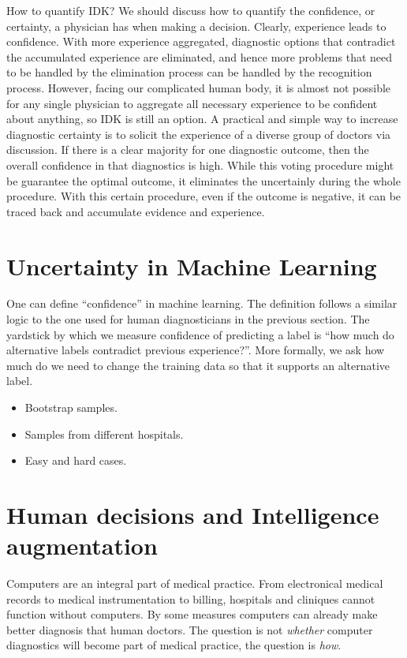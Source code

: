 \documentclass[12pt]{article}
\begin{document}
  How to quantify IDK? We should discuss how to quantify the
  confidence, or certainty, a physician has when making a
  decision. Clearly, experience leads to confidence. With more
  experience aggregated, diagnostic options that contradict the
  accumulated experience are eliminated, and hence more problems that
  need to be handled by the elimination process can be handled by the
  recognition process. However, facing our complicated human body, it
  is almost not possible for any single physician to aggregate all
  necessary experience to be confident about anything, so IDK is still
  an option. A practical and simple way to increase diagnostic
  certainty is to solicit the experience of a diverse group of doctors
  via discussion. If there is a clear majority for one diagnostic
  outcome, then the overall confidence in that diagnostics is
  high. While this voting procedure might be guarantee the optimal
  outcome, it eliminates the uncertainly during the whole
  procedure. With this certain procedure, even if the outcome is
  negative, it can be traced back and accumulate evidence and
  experience.
%


    
\section*{Uncertainty in Machine Learning}

One can define ``confidence'' in machine learning. The definition follows a
similar logic to the one used for human diagnosticians in the previous
section. The yardstick by which we measure confidence of predicting a
label is ``how much do alternative labels contradict previous
experience?''.
More formally, we ask how much do we need to change the training data
so that it supports an alternative label.

\begin{itemize}
  \item Bootstrap samples.
  \item Samples from different hospitals.
  \item Easy and hard cases.
  \end{itemize}

  \section*{Human decisions and Intelligence augmentation}

  Computers are an integral part of medical practice. From
  electronical medical records to medical instrumentation to billing,
  hospitals and cliniques cannot function without computers. By some
  measures computers can already make better diagnosis that human
  doctors. The question is not {\em whether} computer diagnostics will
  become part of medical practice, the question is {\em how}.
\end{document}
